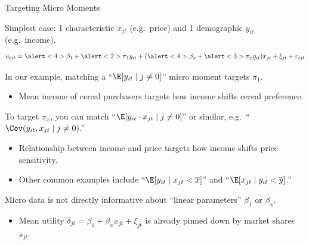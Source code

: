 \documentclass[aspectratio=169,t,11pt,table]{beamer}
\begin{document}
\begin{frame}{Targeting Micro Moments}
    \begin{wideitemize}
        \item Simplest case: 1 characteristic $x_{jt}$ (e.g.\ price) and 1 demographic $y_{it}$ (e.g.\ income).
        \begin{equation*}
            u_{ijt} = \alert<4>{\beta_1} + \alert<2>{\pi_1} y_{it} + (\alert<4>{\beta_x} + \alert<3>{\pi_x} y_{it}) x_{jt} + \xi_{jt} + \varepsilon_{ijt} 
        \end{equation*}
        \vspace{-1.5\baselineskip}
        \pause
        \item In our example, matching a ``$\E[y_{it} \mid j \neq 0]$'' micro moment targets \alert<2>{$\pi_1$}.
        \begin{itemize}
            \item Mean income of cereal purchasers targets how income shifts cereal preference.
        \end{itemize}
        \pause
        \item To target \alert<3>{$\pi_x$}, you can match ``$\E[y_{it} \cdot x_{jt} \mid j \neq 0]$'' or similar, e.g.\ ``$\Cov(y_{it}, x_{jt} \mid j \neq 0)$.''
        \begin{itemize}
            \item Relationship between income and price targets how income shifts price sensitivity.
            \item Other common examples include ``$\E[y_{it} \mid x_{jt} < \overline{x}]$'' and ``$\E[x_{jt} \mid y_{it} < \overline{y}]$.''
        \end{itemize}
        \pause
        \item Micro data is not directly informative about ``linear parameters'' \alert<4>{$\beta_1$} or \alert<4>{$\beta_x$}.
        \begin{itemize}
            \item Mean utility $\delta_{jt} = \beta_1 + \beta_x x_{jt} + \xi_{jt}$ is already pinned down by market shares $s_{jt}$.
        \end{itemize}
    \end{wideitemize}
\end{frame}
\end{document}
